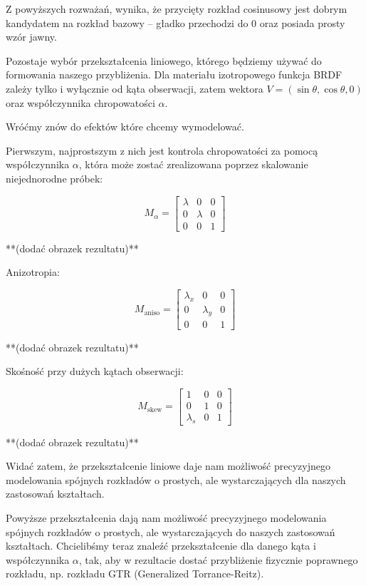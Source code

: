 \documentclass[../main.tex]{subfiles}
\begin{document}
Z powyższych rozważań, wynika, że przycięty rozkład cosinusowy jest dobrym
kandydatem na rozkład bazowy – gładko przechodzi do 0 oraz posiada prosty
wzór jawny.

Pozostaje wybór przekształcenia liniowego, którego będziemy używać do
formowania naszego przybliżenia. Dla materiału izotropowego funkcja BRDF
zależy tylko i wyłącznie od kąta obserwacji, zatem wektora
  $V = (\sin\theta, \cos\theta, 0)$
oraz współczynnika chropowatości $\alpha$.

Wróćmy znów do efektów które chcemy wymodelować.

Pierwszym, najprostszym z nich jest kontrola chropowatości za pomocą
współczynnika $\alpha$, która może zostać zrealizowana poprzez skalowanie
niejednorodne próbek:

$$
M_{\alpha} =
\begin{bmatrix}
  \lambda & 0 & 0 \\
  0 & \lambda & 0 \\
  0 & 0 & 1
\end{bmatrix}
$$

**(dodać obrazek rezultatu)**

Anizotropia:

$$
M_{\text{aniso}} =
\begin{bmatrix}
  \lambda_x & 0 & 0 \\
  0 & \lambda_y & 0 \\
  0 & 0 & 1
\end{bmatrix}
$$

**(dodać obrazek rezultatu)**

Skośność przy dużych kątach obserwacji:

$$
M_{\text{skew}} =
\begin{bmatrix}
  1 & 0 & 0 \\
  0 & 1 & 0 \\
  \lambda_{s} & 0 & 1
\end{bmatrix}
$$

**(dodać obrazek rezultatu)**

Widać zatem, że przekształcenie liniowe daje nam możliwość precyzyjnego
modelowania spójnych rozkładów o prostych, ale wystarczających dla naszych
zastosowań kształtach.

Powyższe przekształcenia dają nam możliwość precyzyjnego modelowania
spójnych rozkładów o prostych, ale wystarczających do naszych zastosowań
kształtach. Chcielibśmy teraz znaleźć przekształcenie dla danego kąta
i współczynnika $\alpha$, tak, aby w rezultacie dostać przybliżenie
fizycznie poprawnego rozkładu, np. rozkładu GTR (Generalized
Torrance-Reitz).
\end{document}
